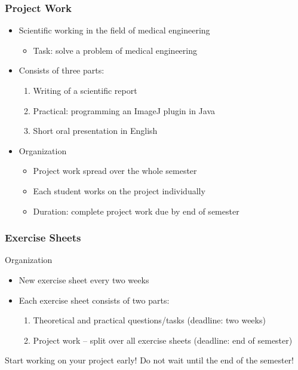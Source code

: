\begin{frame}
	\frametitle{Project Work}
	\begin{itemize}
		\item Scientific working in the field of medical engineering
			\begin{itemize}
				\item Task: solve a problem of medical engineering
			\end{itemize}
		\item Consists of three parts:
			\begin{enumerate}
				\item Writing of a scientific report
				\item Practical: programming an ImageJ plugin in Java
				\item Short oral presentation in English
			\end{enumerate}
		\item Organization
			\begin{itemize}
				\item Project work spread over the whole semester
				\item Each student works on the project individually
				\item Duration: complete project work due by end of semester 
			\end{itemize}
	\end{itemize}
\end{frame}

\begin{frame}
	\frametitle{Exercise Sheets}
	\begin{block}{Organization}
		\begin{itemize}
			\item New exercise sheet every two weeks
			\item Each exercise sheet consists of two parts:
				\begin{enumerate}
					\item Theoretical and practical questions/tasks (deadline: two weeks)
					\item Project work -- split over all exercise sheets (deadline: end of
						semester)
				\end{enumerate}
		\end{itemize}
	\end{block}
	\vspace{-\bigskipamount}
	\begin{center}
	\alert{Start working on your project early!
		Do not wait until the end of the
		semester!}
\end{center}
					
\end{frame}


